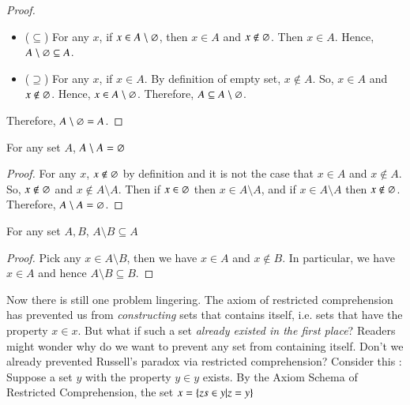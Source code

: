 \begin{proof}
    ~
    \begin{itemize}
        \item ($\subseteq$) For any $x$, if $x\in A\setminus \varnothing$, then $x\in A$ and $x\not\in \varnothing$. Then $x\in A$. Hence, $A\setminus \varnothing \subseteq A$.
        \item ($\supseteq$) For any $x$, if $x\in A$. By definition of empty set, $x\not\in A$. So, $x\in A$ and $x\not\in \varnothing$. Hence, $x\in A\setminus \varnothing$. Therefore, $A\subseteq A\setminus\varnothing$.
    \end{itemize}
    Therefore, $A\setminus \varnothing= A$.
\end{proof}
\begin{prop}
    For any set $A$, $A\setminus A = \varnothing$ 
\end{prop}
\begin{proof}
    For any $x$, $x\not\in\varnothing$ by definition and it is not the case that $x\in A$ and $x\not\in A$. So, $x\not\in\varnothing$ and $x\not\in A\setminus A$. Then if $x\in\varnothing$ then $x\in A\setminus A$, and if $x\in A\setminus A$ then $x\not\in \varnothing$. Therefore, $A\setminus A = \varnothing$.
\end{proof}
\begin{prop}
    For any set $A,B$, $A\setminus B \subseteq A$
\end{prop}
\begin{proof}
    Pick any $x\in A\setminus B$, then we have $x\in A$ and $x\not\in B$. In particular, we have $x\in A$ and hence $A\setminus B \subseteq B$.
\end{proof}
Now there is still one problem lingering. The axiom of restricted comprehension has prevented us from \textit{constructing} sets that contains itself, i.e. sets that have the property $x\in x$. But what if such a set \textit{already existed in the first place}? Readers might wonder why do we want to prevent any set from containing itself. Don't we already prevented Russell's paradox via restricted comprehension? Consider this : Suppose a set $y$ with the property $y\in y$ exists. By the Axiom Schema of Restricted Comprehension, the set $x = \{zs\in y|z=y\}$
